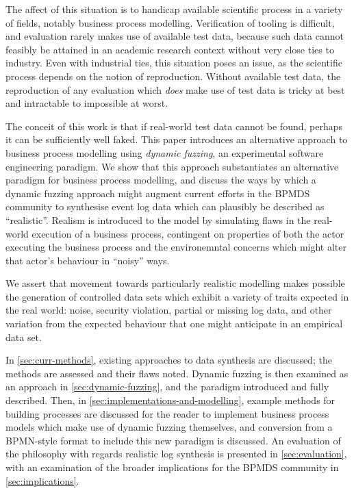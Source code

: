 \documentclass[12pt,draft]{article}
\begin{document}
The affect of this situation is to handicap available scientific process in a
variety of fields, notably business process modelling. Verification of tooling
is difficult, and evaluation rarely makes use of available test data, because
such data cannot feasibly be attained in an academic research context without
very close ties to industry. Even with industrial ties, this situation poses an
issue, as the scientific process depends on the notion of reproduction.
Without available test data, the reproduction of any evaluation which
\emph{does} make use of test data is tricky at best and intractable to
impossible at worst.
\par

The conceit of this work is that if real-world test data cannot be found,
perhaps it can be sufficiently well faked. This paper introduces an alternative
approach to business process modelling using \emph{dynamic fuzzing}, an
experimental software engineering paradigm. We show that this approach
substantiates an alternative paradigm for business process modelling, and
discuss the ways by which a dynamic fuzzing approach might augment current
efforts in the BPMDS community to synthesise event log data which can plausibly
be described as ``realistic''. Realism is introduced to the model by simulating
flaws in the real-world execution of a business process, contingent on
properties of both the actor executing the business process and the
environemntal concerns which might alter that actor's behaviour in ``noisy''
ways.
\par

We assert that movement towards particularly realistic modelling makes possible
the generation of controlled data sets which exhibit a variety of traits
expected in the real world: noise, security violation, partial or missing log
data, and other variation from the expected behaviour that one might anticipate
in an empirical data set.
\par


In \cref{sec:curr-methods}, existing approaches to data synthesis are discussed;
the methods are assessed and their flaws noted. Dynamic fuzzing is then examined
as an approach in \cref{sec:dynamic-fuzzing}, and the paradigm introduced and
fully described. Then, in \cref{sec:implementations-and-modelling}, example
methods for building processes are discussed for the reader to implement
business process models which make use of dynamic fuzzing themselves, and
conversion from a BPMN-style format to include this new paradigm is discussed.
An evaluation of the philosophy with regards realistic log synthesis is
presented in \cref{sec:evaluation}, with an examination of the broader
implications for the BPMDS community in \cref{sec:implications}.
\end{document}

